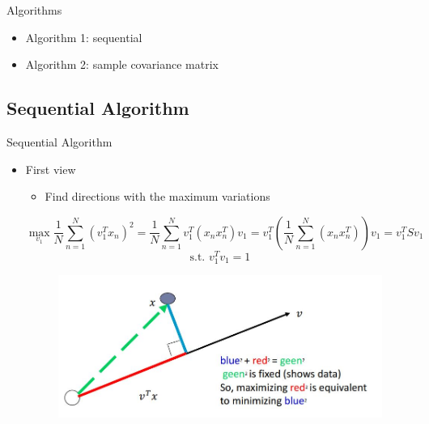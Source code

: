 \documentclass[serif, aspectratio=169]{beamer}
\begin{document}
\begin{frame}{Algorithms}
    \begin{itemize}
        \item Algorithm 1: sequential
        \item Algorithm 2: sample covariance matrix
    \end{itemize}
\end{frame}

\subsection{Sequential Algorithm}

\begin{frame}{Sequential Algorithm}
    \begin{itemize}
        \item First view
        \begin{itemize}
            \item Find directions with the maximum variations 
        \end{itemize}
        $$
        \max_{v_1} \frac{1}{N} \sum_{n=1}^{N} (v_1^T x_n)^2 = \frac{1}{N} \sum_{n=1}^{N} v_1^T (x_n x_n^T) v_1 = v_1^T \left( \frac{1}{N} \sum_{n=1}^{N}(x_n x_n^T) \right) v_1 = v_1^T S {v_1}
        $$
        $$ \text{s.t. } v_1^{T}{v_1}  = 1$$
        \begin{figure}[htpb]
            \begin{center}
                \includegraphics[keepaspectratio, scale=0.6]{pic/var_vs_rec.JPG}
            \end{center}
        \end{figure}
    \end{itemize}
\end{frame}
\end{document}
